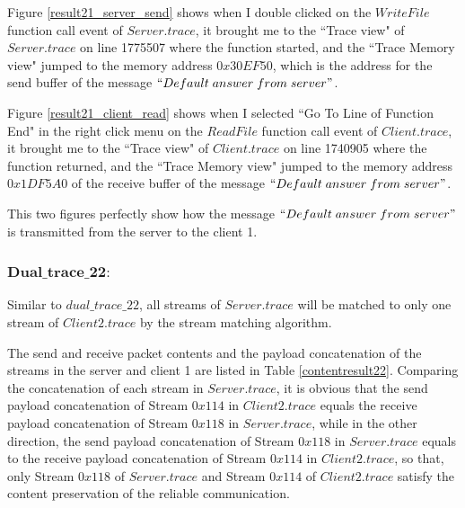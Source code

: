Figure \ref{result21_server_send} shows when I double clicked on the $WriteFile$ function call event of $Server.trace$, it brought me to the ``Trace view" of $Server.trace$ on line 1775507 where the function started, and the ``Trace Memory view" jumped to the memory address $0x30EF50$, which is the address for the send buffer of the message $``Default\; answer\; from\; server"$.

Figure \ref{result21_client_read} shows when I selected ``Go To Line of Function End" in the right click menu on the $ReadFile$ function call event of $Client.trace$, it brought me to the ``Trace view" of $Client.trace$ on line 1740905 where the function returned, and the ``Trace Memory view" jumped to the memory address $0x1DF5A0$ of the receive buffer of the message $``Default\; answer\; from\; server"$.

This two figures perfectly show how the message $``Default\; answer\; from\; server"$ is transmitted from the server to the client 1.

\subsubsection{$\boldsymbol{Dual\_trace\_22:}$}
Similar to $dual\_trace\_22$, all streams of $Server.trace$ will be matched to only one stream of $Client2.trace$ by the stream matching algorithm.

The send and receive packet contents and the payload concatenation of the streams in the server and client 1 are listed in Table \ref{contentresult22}. Comparing the concatenation of each stream in $Server.trace$, it is obvious that the send payload concatenation of Stream $0x114$ in $Client2.trace$ equals the receive payload concatenation of Stream $0x118$ in $Server.trace$, while in the other direction, the send payload concatenation of Stream $0x118$ in $Server.trace$ equals to the receive payload concatenation of Stream $0x114$ in $Client2.trace$, so that, only Stream $0x118$ of $Server.trace$ and Stream $0x114$ of $Client2.trace$ satisfy the content preservation of the reliable communication. 

